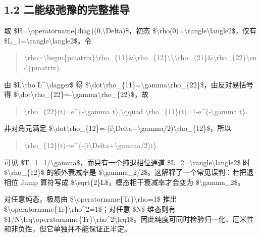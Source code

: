 \documentclass[UTF8,openany,11pt,fontset=fandol]{ctexbook}
\begin{document}
\subsection{\texorpdfstring{\textbf{1.2
二能级弛豫的完整推导}}{1.2 二能级弛豫的完整推导}}\label{ux4e8cux80fdux7ea7ux5f1bux8c6bux7684ux5b8cux6574ux63a8ux5bfc}

取
\$H=\textbackslash operatorname\{diag\}(0,\textbackslash Delta)\$，初态
\$\textbackslash rho(0)=\textbackslash rangle\textbackslash langle2\textbar\$，仅有
\$L\_1=\textbackslash rangle\textbackslash langle2\textbar\$。令

\begin{quote}
\textbackslash rho=\textbackslash begin\{pmatrix\}\textbackslash rho\_\{11\}\&\textbackslash rho\_\{12\}\textbackslash\textbackslash\textbackslash rho\_\{21\}\&\textbackslash rho\_\{22\}\textbackslash end\{pmatrix\}.
\end{quote}

由 \$L\textbackslash rho L\^{}\textbackslash dagger\$ 得
\$\textbackslash dot\textbackslash rho\_\{11\}=\textbackslash gamma\textbackslash rho\_\{22\}\$，由反对易括号得
\$\textbackslash dot\textbackslash rho\_\{22\}=-\textbackslash gamma\textbackslash rho\_\{22\}\$，故

\begin{quote}
\textbackslash rho\_\{22\}(t)=e\^{}\{-\textbackslash gamma
t\},\textbackslash qquad
\textbackslash rho\_\{11\}(t)=1-e\^{}\{-\textbackslash gamma t\}.
\end{quote}

非对角元满足
\$\textbackslash dot\textbackslash rho\_\{12\}=-(i\textbackslash Delta+\textbackslash gamma/2)\textbackslash rho\_\{12\}\$，所以

\begin{quote}
\textbackslash rho\_\{12\}(t)=e\^{}\{-(i\textbackslash Delta+\textbackslash gamma/2)t\}.
\end{quote}

可见 \$T\_1=1/\textbackslash gamma\$，而只有一个纯退相位通道
\$L\_2=\textbackslash rangle\textbackslash langle2\textbar\$ 时
\$\textbackslash rho\_\{12\}\$ 的额外衰减率是
\$\textbackslash gamma\_2/2\$。这解释了一个常见误判：若把退相位 Jump
算符写成 \$\textbackslash sqrt\{2\}L\$，模态相干衰减率才会变为
\$\textbackslash gamma\_2\$。

对任意纯态，极易由
\$\textbackslash operatorname\{Tr\}\textbackslash rho=1\$ 推出
\$\textbackslash operatorname\{Tr\}\textbackslash rho\^{}2=1\$；对任意
\$N\$ 维态则有
\$1/N\textbackslash leq\textbackslash operatorname\{Tr\}\textbackslash rho\^{}2\textbackslash leq1\$。因此纯度可同时检验归一化、厄米性和非负性，但它单独并不能保证正半定。
\end{document}
